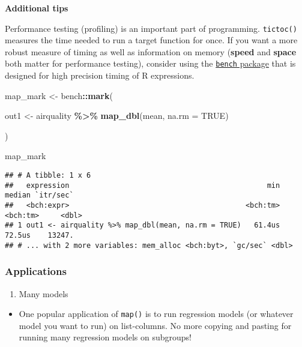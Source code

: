 \documentclass[
]{book}
\newenvironment{Shaded}{\begin{snugshade}}{\end{snugshade}}
\newcommand{\DataTypeTok}[1]{\textcolor[rgb]{0.13,0.29,0.53}{#1}}
\newcommand{\KeywordTok}[1]{\textcolor[rgb]{0.13,0.29,0.53}{\textbf{#1}}}
\newcommand{\NormalTok}[1]{#1}
\newcommand{\OperatorTok}[1]{\textcolor[rgb]{0.81,0.36,0.00}{\textbf{#1}}}
\newcommand{\OtherTok}[1]{\textcolor[rgb]{0.56,0.35,0.01}{#1}}
\newcommand{\StringTok}[1]{\textcolor[rgb]{0.31,0.60,0.02}{#1}}
\providecommand{\tightlist}{%
  \setlength{\itemsep}{0pt}\setlength{\parskip}{0pt}}
\begin{document}
\textbf{Additional tips}

Performance testing (profiling) is an important part of programming. \texttt{tictoc()} measures the time needed to run a target function for once. If you want a more robust measure of timing as well as information on memory (\textbf{speed} and \textbf{space} both matter for performance testing), consider using the \href{https://github.com/r-lib/bench}{\texttt{bench} package} that is designed for high precision timing of R expressions.

\begin{Shaded}
\begin{Highlighting}[]
\NormalTok{map\_mark \textless{}{-}}\StringTok{ }\NormalTok{bench}\OperatorTok{::}\KeywordTok{mark}\NormalTok{(}

\NormalTok{  out1 \textless{}{-}}\StringTok{ }\NormalTok{airquality }\OperatorTok{\%\textgreater{}\%}\StringTok{ }\KeywordTok{map\_dbl}\NormalTok{(mean, }\DataTypeTok{na.rm =} \OtherTok{TRUE}\NormalTok{)}

\NormalTok{  )}

\NormalTok{map\_mark}
\end{Highlighting}
\end{Shaded}

\begin{verbatim}
## # A tibble: 1 x 6
##   expression                                              min   median `itr/sec`
##   <bch:expr>                                         <bch:tm> <bch:tm>     <dbl>
## 1 out1 <- airquality %>% map_dbl(mean, na.rm = TRUE)   61.4us   72.5us    13247.
## # ... with 2 more variables: mem_alloc <bch:byt>, `gc/sec` <dbl>
\end{verbatim}

\hypertarget{applications}{%
\subsubsection{Applications}\label{applications}}

\begin{enumerate}
\def\labelenumi{\arabic{enumi}.}
\tightlist
\item
  Many models
\end{enumerate}

\begin{itemize}
\tightlist
\item
  One popular application of \texttt{map()} is to run regression models (or whatever model you want to run) on list-columns. No more copying and pasting for running many regression models on subgroups!
\end{itemize}
\end{document}

